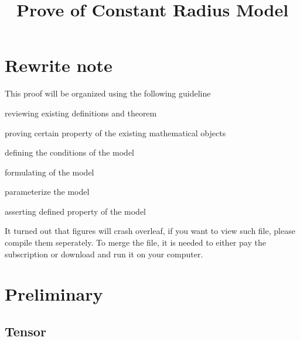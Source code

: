 \documentclass[stu, babel, american, biblatex, a4paper, leqno, draftall]{apa7}
\title{Prove of Constant Radius Model}
\begin{document}
\maketitle
\tableofcontents

\section{Rewrite note}
This proof will be organized using the following guideline
\begin{APAenumerate}
    \item reviewing existing definitions and theorem
    \item proving certain property of the existing mathematical objects
    \item defining the conditions of the model
    \item formulating of the model
    \item parameterize the model
    \item asserting defined property of the model
\end{APAenumerate}
It turned out that figures will crash overleaf, if you want to view such file, please compile them seperately.
To merge the file, it is needed to either pay the subscription or download and run it on your computer.

\section{Preliminary}

\subsection{Tensor}
\end{document}
